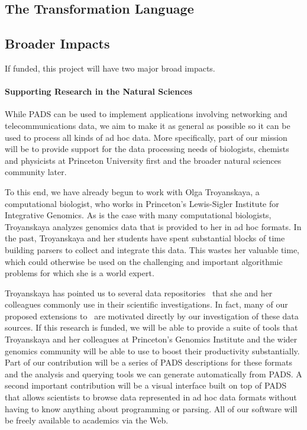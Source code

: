 \documentclass[11pt]{article}
\begin{document}
\subsection{The \datatype{} Transformation Language}

\subsection{Broader Impacts}
\label{ssec:impact}

If funded, this project will have two major broad impacts.

\paragraph*{Supporting Research in the Natural Sciences}
While PADS can be used to implement applications involving
networking and telecommunications data,  we aim to make it
as general as possible so it can be used to process all
kinds of ad hoc data.  More specifically, part of our mission will be
to provide support for the data processing needs of biologists,
chemists and physicists at Princeton University first and 
the broader natural sciences community later.  
 
To this end, we have already begun to work with Olga Troyanskaya, a
computational biologist, who works in Princeton's Lewis-Sigler Institute 
for Integrative Genomics.  
As is the case with many computational biologists,
Troyanskaya analyzes genomics data that is provided to her in ad hoc
formats.  In the past, Troyanskaya and her students have spent
substantial blocks of time building parsers to collect and integrate
this data.  This wastes her valuable time, which could otherwise be
used on the challenging and important algorithmic problems for which
she is a world expert.

Troyanskaya has pointed us to several data
repositories~\cite{grid,bind,geneontology} that she and her colleagues
commonly use in their scientific investigations.  
In fact, many of our proposed extensions to \pads{}\ are motivated directly by
our investigation of these data sources.
If this research is
funded, we will be able to provide a suite of tools that Troyanskaya
and her colleagues at Princeton's Genomics Institute and the wider
genomics community will be able to use to boost their productivity
substantially.  Part of our contribution will be a series of PADS
descriptions for these formats and the analysis and querying tools we
can generate automatically from PADS.  A second important contribution
will be a visual interface built on top of PADS that allows scientists
to browse data represented in ad hoc data formats without having to
know anything about programming or parsing.  All of our software will
be freely available to academics via the Web.
\end{document}
